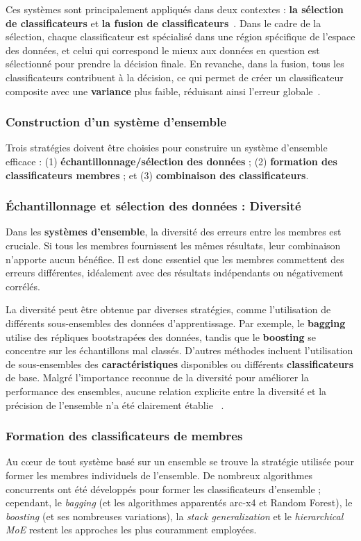 Ces systèmes sont principalement appliqués dans deux contextes : \textbf{la sélection de classificateurs} et \textbf{la fusion de classificateurs}~\cite{kuncheva2004}. Dans le cadre de la sélection, chaque classificateur est spécialisé dans une région spécifique de l'espace des données, et celui qui correspond le mieux aux données en question est sélectionné pour prendre la décision finale. En revanche, dans la fusion, tous les classificateurs contribuent à la décision, ce qui permet de créer un classificateur composite avec une \textbf{variance} plus faible, réduisant ainsi l'erreur globale~\cite{breiman1996, freund1997}.

\subsubsection*{Construction d'un système d'ensemble}
Trois stratégies doivent être choisies pour construire un système d'ensemble efficace : (1) \textbf{échantillonnage/sélection des données} ; (2) \textbf{formation des classificateurs membres} ; et (3) \textbf{combinaison des classificateurs}.

\subsubsection{Échantillonnage et sélection des données : Diversité}
Dans les \textbf{systèmes d'ensemble}, la diversité des erreurs entre les membres est cruciale. Si tous les membres fournissent les mêmes résultats, leur combinaison n'apporte aucun bénéfice. Il est donc essentiel que les membres commettent des erreurs différentes, idéalement avec des résultats indépendants ou négativement corrélés.

La diversité peut être obtenue par diverses stratégies, comme l'utilisation de différents sous-ensembles des données d'apprentissage. Par exemple, le \textbf{bagging} utilise des répliques bootstrapées des données, tandis que le \textbf{boosting} se concentre sur les échantillons mal classés. D'autres méthodes incluent l'utilisation de sous-ensembles des \textbf{caractéristiques} disponibles ou différents \textbf{classificateurs} de base. Malgré l'importance reconnue de la diversité pour améliorer la performance des ensembles, aucune relation explicite entre la diversité et la précision de l'ensemble n'a été clairement établie ~\cite{polikar2012ensemble}.

\subsubsection{Formation des classificateurs de membres}
Au cœur de tout système basé sur un ensemble se trouve la stratégie utilisée pour former les membres individuels de l'ensemble. De nombreux algorithmes concurrents ont été développés pour former les classificateurs d'ensemble ; cependant, le \textit{bagging} (et les algorithmes apparentés arc-x4 et Random Forest), le \textit{boosting} (et ses nombreuses variations), la \textit{stack generalization} et le \textit{hierarchical MoE} restent les approches les plus couramment employées.

